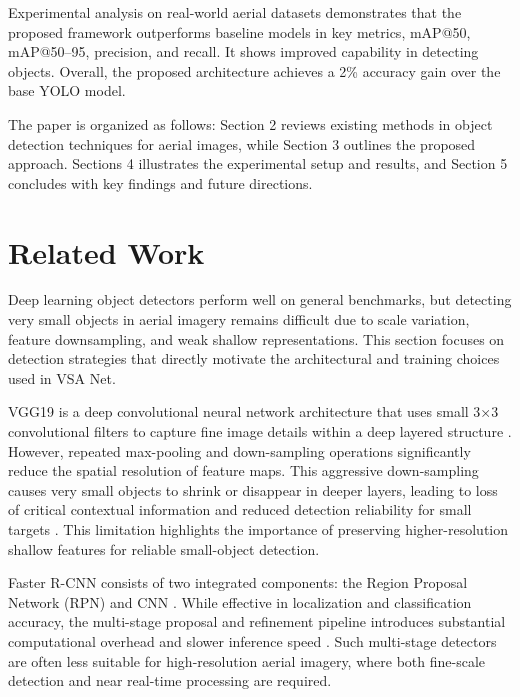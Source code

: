 \documentclass[preprint,review,12pt]{elsarticle}
\begin{document}
Experimental analysis on real-world aerial datasets demonstrates that the proposed framework outperforms baseline models in key metrics, mAP@50, mAP@50–95, precision, and recall. It shows improved capability in detecting objects. Overall, the proposed architecture achieves a 2\% accuracy gain over the base YOLO model.


The paper is organized as follows: Section 2 reviews existing methods in object detection techniques for aerial images, while Section 3 outlines the proposed approach. Sections 4 illustrates the experimental setup and results, and Section 5 concludes with key findings and future directions.

\section{Related Work}
Deep learning object detectors perform well on general benchmarks, but detecting very small objects in aerial imagery remains difficult due to scale variation, feature downsampling, and weak shallow representations. This section focuses on detection strategies that directly motivate the architectural and training choices used in VSA Net.

VGG19 is a deep convolutional neural network architecture that uses small 3×3 convolutional filters to capture fine image details within a deep layered structure \cite{simonyan2014very}. However, repeated max-pooling and down-sampling operations significantly reduce the spatial resolution of feature maps. This aggressive down-sampling causes very small objects to shrink or disappear in deeper layers, leading to loss of critical contextual information and reduced detection reliability for small targets \cite{ren2016faster}. This limitation highlights the importance of preserving higher-resolution shallow features for reliable small-object detection.


Faster R-CNN consists of two integrated components: the Region Proposal Network (RPN) and CNN \cite{ren2016faster, ke2021lightweight}. While effective in localization and classification accuracy, the multi-stage proposal and refinement pipeline introduces substantial computational overhead and slower inference speed \cite{Redmon2016, glenn_jocher_2020_4154370}. Such multi-stage detectors are often less suitable for high-resolution aerial imagery, where both fine-scale detection and near real-time processing are required.
\end{document}
